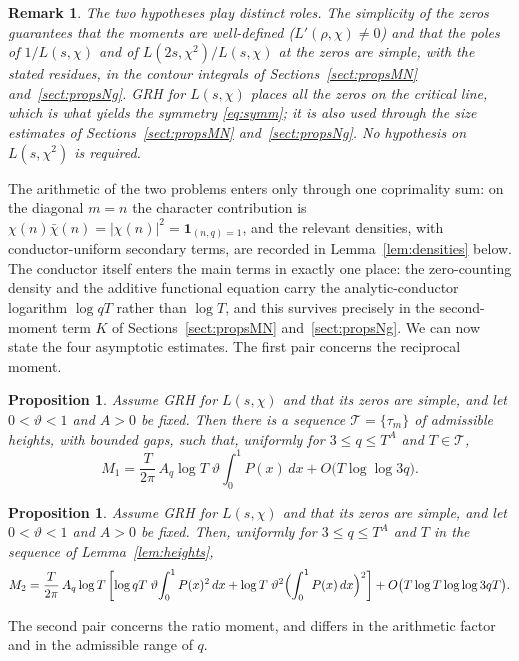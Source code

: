 \documentclass[10pt,a4paper]{amsart}
\newtheorem{proposition}[theorem]{Proposition}
\newtheorem*{remark}{Remark}
\numberwithin{equation}{section}
\begin{document}
\begin{remark}
The two hypotheses play distinct roles. The simplicity of the zeros guarantees that the moments are well-defined ($L'(\rho,\chi)\ne0$) and that the poles of $1/L(s,\chi)$ and of $L(2s,\chi^2)/L(s,\chi)$ at the zeros are simple, with the stated residues, in the contour integrals of Sections~\ref{sect:propsMN} and~\ref{sect:propsNg}. GRH for $L(s,\chi)$ places all the zeros on the critical line, which is what yields the symmetry \eqref{eq:symm}; it is also used through the size estimates of Sections~\ref{sect:propsMN} and~\ref{sect:propsNg}. No hypothesis on $L(s,\chi^2)$ is required.
\end{remark}

The arithmetic of the two problems enters only through one coprimality sum: on the diagonal $m=n$ the character contribution is $\chi(n)\bar\chi(n)=|\chi(n)|^2=\mathbf 1_{(n,q)=1}$, and the relevant densities, with conductor-uniform secondary terms, are recorded in Lemma~\ref{lem:densities} below. The conductor itself enters the main terms in exactly one place: the zero-counting density and the additive functional equation carry the analytic-conductor logarithm $\log qT$ rather than $\log T$, and this survives precisely in the second-moment term $K$ of Sections~\ref{sect:propsMN} and~\ref{sect:propsNg}. We can now state the four asymptotic estimates. The first pair concerns the reciprocal moment.

\begin{proposition}\label{prop:M1MN}
Assume GRH for $L(s,\chi)$ and that its zeros are simple, and let $0<\vartheta<1$ and $A>0$ be fixed. Then there is a sequence $\mathcal T=\{\tau_m\}$ of admissible heights, with bounded gaps, such that, uniformly for $3\le q\le T^{A}$ and $T\in\mathcal T$,
\[
M_1=\frac{T}{2\pi}\,A_q\log T\;\vartheta\!\int_0^1 P(x)\,dx+O\bigl(T\log\log 3q\bigr).
\]
\end{proposition}

\begin{proposition}\label{prop:M2MN}
Assume GRH for $L(s,\chi)$ and that its zeros are simple, and let $0<\vartheta<1$ and $A>0$ be fixed. Then, uniformly for $3\le q\le T^{A}$ and $T$ in the sequence of Lemma~\ref{lem:heights},
\[
M_2=\frac{T}{2\pi}\,A_q\log T\left[\log qT\;\vartheta\!\int_0^1 P(x)^2\,dx+\log T\;\vartheta^2\Bigl(\int_0^1 P(x)\,dx\Bigr)^2\right]+O\bigl(T\log T\log\log 3qT\bigr).
\]
\end{proposition}

The second pair concerns the ratio moment, and differs in the arithmetic factor and in the admissible range of $q$.
\end{document}
